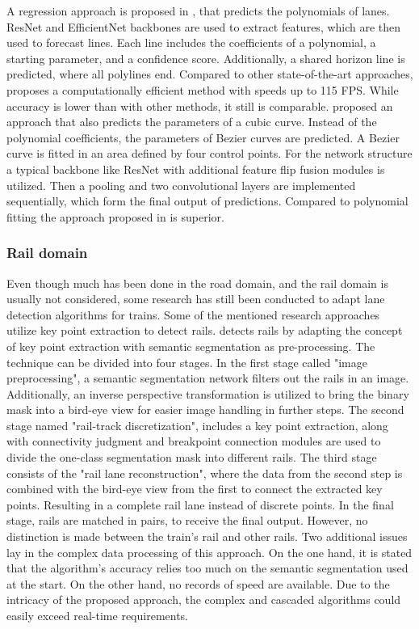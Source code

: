 A regression approach is proposed in \cite{PolyLaneNetRoad2021}, that predicts the polynomials of lanes.
ResNet and EfficientNet backbones are used to extract features, which are then used to forecast lines.
Each line includes the coefficients of a polynomial, a starting parameter, and a confidence score.
Additionally, a shared horizon line is predicted, where all polylines end.
Compared to other state-of-the-art approaches, \cite{PolyLaneNetRoad2021} proposes a computationally efficient method with speeds up to 115 \ac{FPS}.
While accuracy is lower than with other methods, it still is comparable.
\cite{DetectingLanesWithBezierCurves2023} proposed an approach that also predicts the parameters of a cubic curve.
Instead of the polynomial coefficients, the parameters of Bezier curves are predicted.
A Bezier curve is fitted in an area defined by four control points.
For the network structure a typical backbone like ResNet with additional feature flip fusion modules is utilized.
Then a pooling and two convolutional layers are implemented sequentially, which form the final output of predictions.
Compared to polynomial fitting the approach proposed in \cite{DetectingLanesWithBezierCurves2023} is superior.

\subsubsection{Rail domain}

Even though much has been done in the road domain, and the rail domain is usually not considered, some research has still been conducted to adapt lane detection algorithms for trains.
Some of the mentioned research approaches utilize key point extraction to detect rails.
\cite{topologyGuidedRailDetection2022} detects rails by adapting the concept of key point extraction with semantic segmentation as pre-processing.
The technique can be divided into four stages.
In the first stage called "image preprocessing", a semantic segmentation network filters out the rails in an image.
Additionally, an inverse perspective transformation is utilized to bring the binary mask into a bird-eye view for easier image handling in further steps.
The second stage named "rail-track discretization", includes a key point extraction, along with connectivity judgment and breakpoint connection modules are used to divide the one-class segmentation mask into different rails.
The third stage consists of the "rail lane reconstruction", where the data from the second step is combined with the bird-eye view from the first to connect the extracted key points. Resulting in a complete rail lane instead of discrete points.
In the final stage, rails are matched in pairs, to receive the final output.
However, no distinction is made between the train's rail and other rails.
Two additional issues lay in the complex data processing of this approach.
On the one hand, it is stated that the algorithm's accuracy relies too much on the semantic segmentation used at the start.
On the other hand, no records of speed are available.
Due to the intricacy of the proposed approach, the complex and cascaded algorithms could easily exceed real-time requirements.

